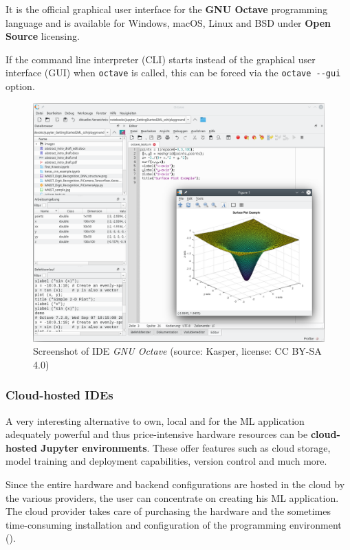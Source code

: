 \documentclass [oneside,10pt,a4paper,ngerman,BCOR10mm,headsepline,parindent,final]{scrartcl}
\begin{document}
It is the official graphical user interface for the \textbf{GNU Octave}
programming language and is available for Windows, macOS, Linux and BSD
under \textbf{Open Source} licensing.

If the command line interpreter (CLI) starts instead of the graphical
user interface (GUI) when \texttt{octave} is called, this can be forced
via the \texttt{octave\ -\/-gui} option.

\begin{figure}
\centering
\includegraphics{images/Screenshot_GNU_Octave.png}
\caption{Screenshot of IDE \emph{GNU Octave} (source: Kasper, license:
CC BY-SA 4.0)}
\end{figure}

    \hypertarget{cloud-hosted-ides}{%
\subsubsection{Cloud-hosted IDEs}\label{cloud-hosted-ides}}

A very interesting alternative to own, local and for the ML application
adequately powerful and thus price-intensive hardware resources can be
\textbf{cloud-hosted Jupyter environments}. These offer features such as
cloud storage, model training and deployment capabilities, version
control and much more.

Since the entire hardware and backend configurations are hosted in the
cloud by the various providers, the user can concentrate on creating his
ML application. The cloud provider takes care of purchasing the hardware
and the sometimes time-consuming installation and configuration of the
programming environment (\cite{Colab_Alternatives_2021}).
\end{document}
